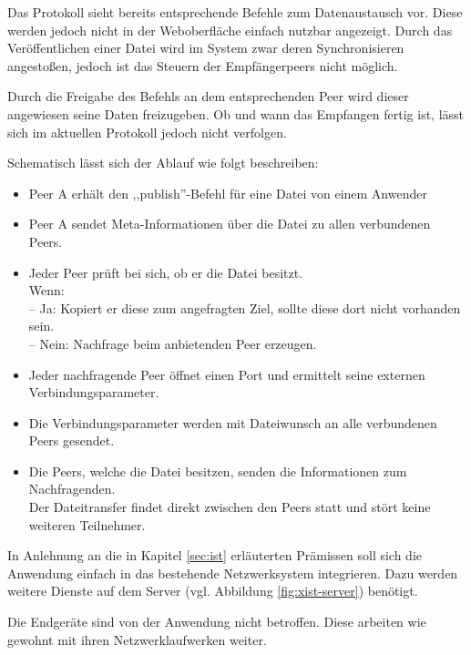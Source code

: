 \documentclass[oneside, ngerman, toc=bibliography,bibliography=totoc,listof=entryprefix, open=right,numbers=noenddot,fontsize=12pt]{scrbook}
\begin{document}
Das Protokoll sieht bereits entsprechende Befehle zum Datenaustausch vor. Diese werden jedoch nicht in der Weboberfläche einfach nutzbar angezeigt. Durch das Veröffentlichen einer Datei wird im System zwar deren Synchronisieren angestoßen, jedoch ist das Steuern der Empfängerpeers nicht möglich.

Durch die Freigabe des Befehls an dem entsprechenden Peer wird dieser angewiesen seine Daten freizugeben. Ob und wann das Empfangen fertig ist, lässt sich im aktuellen Protokoll jedoch nicht verfolgen. 

\bigskip
Schematisch lässt sich der Ablauf wie folgt beschreiben:

\begin{itemize}
\item Peer A erhält den ,,publish''-Befehl für eine Datei von einem Anwender
\item Peer A sendet Meta-Informationen über die Datei zu allen verbundenen Peers.
\item Jeder Peer prüft bei sich, ob er die Datei besitzt.
\\ Wenn: \\
-- Ja: Kopiert er diese zum angefragten Ziel, sollte diese dort nicht vorhanden sein.\\
-- Nein: Nachfrage beim anbietenden Peer erzeugen.
\item Jeder nachfragende Peer öffnet einen Port und ermittelt seine externen Verbindungsparameter.
\item Die Verbindungsparameter werden mit Dateiwunsch an alle verbundenen Peers gesendet.
\item Die Peers, welche die Datei besitzen, senden die Informationen zum Nachfragenden.\\
Der Dateitransfer findet direkt zwischen den Peers statt und stört keine weiteren Teilnehmer.
\end{itemize}

In Anlehnung an die in Kapitel \ref{sec:ist} erläuterten Prämissen soll sich die Anwendung einfach in das bestehende Netzwerksystem integrieren. Dazu werden weitere Dienste auf dem Server (vgl. Abbildung \ref{fig:xist-server}) benötigt.
 
Die Endgeräte sind von der Anwendung nicht betroffen. Diese arbeiten wie gewohnt mit ihren Netzwerklaufwerken weiter.
 
\bigskip
 
\end{document}
